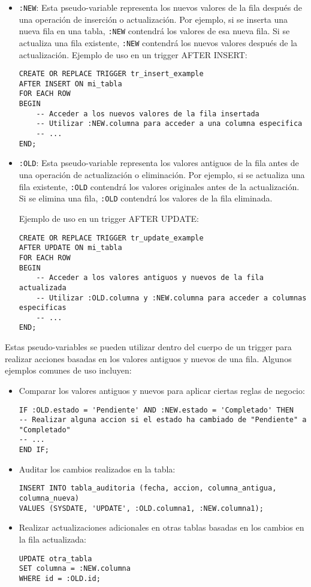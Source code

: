 \documentclass[executivepaper]{article}
\begin{document}
\begin{itemize}
\item \texttt{:NEW}: Esta pseudo-variable representa los nuevos valores de la fila después de una operación de inserción o actualización. Por ejemplo, si se inserta una nueva fila en una tabla, \texttt{:NEW} contendrá los valores de esa nueva fila. Si se actualiza una fila existente, \texttt{:NEW} contendrá los nuevos valores después de la actualización.
Ejemplo de uso en un trigger AFTER INSERT:
\begin{lstlisting}
CREATE OR REPLACE TRIGGER tr_insert_example
AFTER INSERT ON mi_tabla
FOR EACH ROW
BEGIN
    -- Acceder a los nuevos valores de la fila insertada
    -- Utilizar :NEW.columna para acceder a una columna especifica
    -- ...
END;
\end{lstlisting}

\item \texttt{:OLD}: Esta pseudo-variable representa los valores antiguos de la fila antes de una operación de actualización o eliminación. Por ejemplo, si se actualiza una fila existente, \texttt{:OLD} contendrá los valores originales antes de la actualización. Si se elimina una fila, \texttt{:OLD} contendrá los valores de la fila eliminada.

Ejemplo de uso en un trigger AFTER UPDATE:
\begin{lstlisting}
CREATE OR REPLACE TRIGGER tr_update_example
AFTER UPDATE ON mi_tabla
FOR EACH ROW
BEGIN
    -- Acceder a los valores antiguos y nuevos de la fila actualizada
    -- Utilizar :OLD.columna y :NEW.columna para acceder a columnas especificas
    -- ...
END;
\end{lstlisting}

\end{itemize}

Estas pseudo-variables se pueden utilizar dentro del cuerpo de un trigger para realizar acciones basadas en los valores antiguos y nuevos de una fila. Algunos ejemplos comunes de uso incluyen:

\begin{itemize}
\item Comparar los valores antiguos y nuevos para aplicar ciertas reglas de negocio:
\begin{lstlisting}
IF :OLD.estado = 'Pendiente' AND :NEW.estado = 'Completado' THEN
-- Realizar alguna accion si el estado ha cambiado de "Pendiente" a "Completado"
-- ...
END IF;
\end{lstlisting}

\item Auditar los cambios realizados en la tabla:
\begin{lstlisting}
INSERT INTO tabla_auditoria (fecha, accion, columna_antigua, columna_nueva)
VALUES (SYSDATE, 'UPDATE', :OLD.columna1, :NEW.columna1);
\end{lstlisting}

\item Realizar actualizaciones adicionales en otras tablas basadas en los cambios en la fila actualizada:
\begin{lstlisting}
UPDATE otra_tabla
SET columna = :NEW.columna
WHERE id = :OLD.id;
\end{lstlisting}
\end{itemize}
\end{document}
